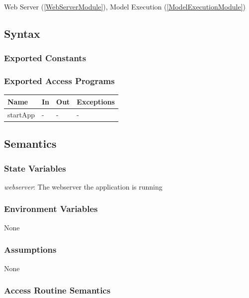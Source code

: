 \documentclass[12pt, titlepage]{article}
\begin{document}
Web Server (\ref{WebServerModule}), Model Execution (\ref{ModelExecutionModule})
\subsection{Syntax}

\subsubsection{Exported Constants}

\subsubsection{Exported Access Programs}

\begin{center}
\begin{tabular}{p{2cm} p{4cm} p{4cm} p{2cm}}
\hline
\textbf{Name} & \textbf{In} & \textbf{Out} & \textbf{Exceptions} \\
\hline
startApp & - & - & - \\
\hline
\end{tabular}
\end{center}

\subsection{Semantics}

\subsubsection{State Variables}

\textit{webserver}: The webserver the application is running

\subsubsection{Environment Variables}

None

\subsubsection{Assumptions}

None

\subsubsection{Access Routine Semantics}
\end{document}
